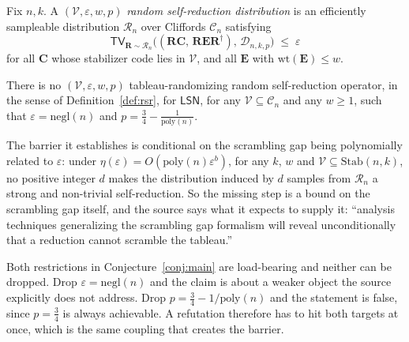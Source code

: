 \documentclass{aicr-conjecture}
\newcommand{\eps}{\varepsilon}
\newcommand{\LSN}{\mathsf{LSN}}
\newcommand{\Cliff}{\mathcal{C}}
\newcommand{\TV}{\mathsf{TV}}
\begin{document}
\begin{definition}\label{def:rsr}
Fix $n, k$. A $(\mathcal{V}, \eps, w, p)$ \emph{random self-reduction
distribution} is an efficiently sampleable distribution $\mathcal{R}_{n}$
over Cliffords $\Cliff_{n}$ satisfying
\[
  \TV_{\mathbf{R} \sim \mathcal{R}_{n}}
  \bigl((\mathbf{R}\mathbf{C},\, \mathbf{R}\mathbf{E}\mathbf{R}^{\dagger}),\,
  \mathcal{D}_{n,k,p}\bigr) \;\le\; \eps
\]
for all $\mathbf{C}$ whose stabilizer code lies in $\mathcal{V}$, and all
$\mathbf{E}$ with $\mathrm{wt}(\mathbf{E}) \le w$.
\end{definition}

\begin{conjecture}\label{conj:main}
There is no $(\mathcal{V}, \eps, w, p)$ tableau-randomizing random
self-reduction operator, in the sense of Definition~\ref{def:rsr}, for
$\LSN$, for any $\mathcal{V} \subseteq \Cliff_{n}$ and any $w \ge 1$,
such that $\eps = \mathrm{negl}(n)$ and $p = \frac{3}{4} -
\frac{1}{\mathrm{poly}(n)}$.
\end{conjecture}

\begin{remark}\label{rem:conditional}
The barrier it establishes is conditional on the scrambling gap being
polynomially related to $\eps$: under $\eta(\eps) =
O(\mathrm{poly}(n)\eps^{b})$, for any $k$, $w$ and $\mathcal{V} \subseteq
\mathrm{Stab}(n,k)$, no positive integer $d$ makes the distribution
induced by $d$ samples from $\mathcal{R}_{n}$ a strong and non-trivial
self-reduction. So the missing step is a bound on the scrambling gap
itself, and the source says what it expects to supply it: ``analysis
techniques generalizing the scrambling gap formalism will reveal
unconditionally that a reduction cannot scramble the tableau.''
\end{remark}

\begin{remark}\label{rem:params}
Both restrictions in Conjecture~\ref{conj:main} are load-bearing and
neither can be dropped. Drop $\eps = \mathrm{negl}(n)$ and the claim is
about a weaker object the source explicitly does not address. Drop $p =
\frac{3}{4} - 1/\mathrm{poly}(n)$ and the statement is false, since $p =
\frac{3}{4}$ is always achievable. A refutation therefore has to hit both
targets at once, which is the same coupling that creates the barrier.
\end{remark}
\end{document}
